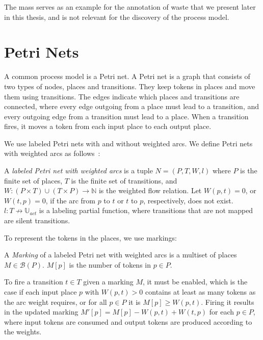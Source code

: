     The mass serves as an example for the annotation of waste that we present later in this thesis, and is not relevant for the discovery of the process model.
    

    
    \section{Petri Nets}


    
    A common process model is a Petri net.
    A Petri net is a graph that consists of two types of nodes, places and transitions.
    They keep tokens in places and move them using transitions.
    The edges indicate which places and transitions are connected, where every edge outgoing from a place must lead to a transition, and every outgoing edge from a transition must lead to a place.
    When a transition fires, it moves a token from each input place to each output place.



    We use labeled Petri nets with and without weighted arcs.
    We define Petri nets with weighted arcs as follows~\autocite{carmona2010}:
    \begin{definition}
        A \emph{labeled Petri net with weighted arcs} is a tuple $N = (P, T, W, l)$ where $P$ is the finite set of places, $T$ is the finite set of transitions, and $W: (P \times T) \cup (T \times P) \to \mathbb{N}$ is the weighted flow relation.
        Let $W(p, t) = 0$, or $W(t, p) = 0$, if the arc from $p$ to $t$ or $t$ to $p$, respectively, does not exist.
        $l: T \not \to \mathbb{U}_{act}$ is a labeling partial function, where transitions that are not mapped are silent transitions.
    \end{definition}

    To represent the tokens in the places, we use markings:
    \begin{definition}[Marking]
        A \emph{Marking} of a labeled Petri net with weighted arcs is a multiset of places $M \in \mathcal{B}(P)$.
        $M[p]$ is the number of tokens in $p \in P$.
    \end{definition}



    To fire a transition $t \in T$ given a marking $M$, it must be enabled, which is the case if each input place $p$ with $W(p, t) > 0$ contains at least as many tokens as the arc weight requires, or for all $p \in P$ it is $M[p] \geq W(p, t)$.
    Firing it results in the updated marking $M'[p] = M[p] - W(p, t) + W(t, p)$ for each $p \in P$, where input tokens are consumed and output tokens are produced according to the weights.



